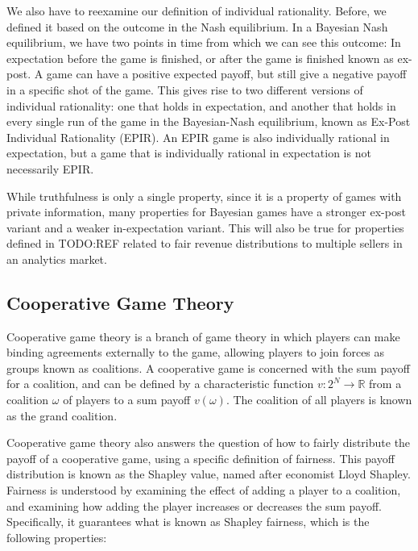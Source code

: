 We also have to reexamine our definition of individual rationality. Before, we
defined it based on the outcome in the Nash equilibrium. In a Bayesian Nash
equilibrium, we have two points in time from which we can see this outcome: In
expectation before the game is finished, or after the game is finished known as
ex-post. A game can have a positive expected payoff, but still give a negative
payoff in a specific shot of the game. This gives rise to two different
versions of individual rationality: one that holds in expectation, and another
that holds in every single run of the game in the Bayesian-Nash equilibrium,
known as Ex-Post Individual Rationality (EPIR). An EPIR game is also
individually rational in expectation, but a game that is individually rational
in expectation is not necessarily EPIR.

While truthfulness is only a single property, since it is a property of games
with private information, many properties for Bayesian games have a stronger
ex-post variant and a weaker in-expectation variant. This will also be true for
properties defined in TODO:REF related to fair revenue distributions to
multiple sellers in an analytics market.

\subsection{Cooperative Game Theory}

Cooperative game theory is a branch of game theory in which players can make
binding agreements externally to the game, allowing players to join forces as
groups known as coalitions. A cooperative game is concerned with the sum payoff
for a coalition, and can be defined by a characteristic function $v: 2^N
\rightarrow \mathbb R$ from a coalition $\omega$ of players to a sum payoff
$v(\omega)$. The coalition of all players is known as the grand coalition.


Cooperative game theory also answers the question of how to fairly distribute
the payoff of a cooperative game, using a specific definition of fairness. This
payoff distribution is known as the Shapley value, named after economist Lloyd
Shapley. Fairness is understood by examining the effect of adding a player to a
coalition, and examining how adding the player increases or decreases the sum
payoff. Specifically, it guarantees what is known as Shapley fairness, which is
the following properties:

